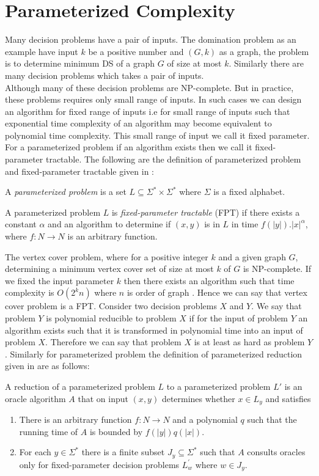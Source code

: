 \section{Parameterized Complexity}
\noindent
Many decision problems have a pair of inputs. The domination problem as an example have input $k$ be a positive number and $(G,k)$ as a graph, the problem is to determine minimum DS of a graph $G$ of size at most $k$. Similarly there are many decision problems which takes a pair of inputs.\\
\noindent
Although many of these decision problems are NP-complete. But in practice, these problems requires only small range of inputs. In such cases we can design an algorithm for fixed range of inputs i.e for small range of inputs such that exponential time complexity of an algorithm may become equivalent to polynomial time complexity. This small range of input we call it fixed parameter. For a parameterized problem if an algorithm exists then we call it fixed-parameter tractable. The following are the definition of parameterized problem and fixed-parameter tractable given in \cite{ppc}:
\begin{Definition}
A \textit{parameterized problem} is a set $L \subseteq \Sigma ^* \times \Sigma ^*$ where $ \Sigma $ is a fixed alphabet.
\end{Definition}
\begin{Definition}
A {parameterized problem} $L$ is \textit{fixed-parameter tractable} (FPT) if there exists a constant $\alpha$ and an algorithm to determine if $(x,y)$ is in $L$ in time $f(|y|).|x|^{ \alpha }$, where $f:N \rightarrow N$ is an arbitrary function.
\end{Definition}
\noindent
The vertex cover problem, where for a positive integer $k$ and a given graph $G$, determining a minimum vertex cover set of size at most $k$ of $G$ is NP-complete. If we fixed the input parameter $k$ then there exists an algorithm such that time complexity is $O(2^kn)$ where $n$ is order of graph \cite{ppc} . Hence we can say that vertex cover problem is a FPT. Consider two decision problems $X$ and $Y$. We say that problem $Y$ is polynomial reducible to problem $X$ if for the input of problem $Y$ an algorithm exists such that it is transformed in polynomial time into an input of problem $X$. Therefore we can say that problem $X$ is at least as hard as problem $Y$. Similarly for parameterized problem the definition of parameterized reduction given in \cite{ppc} are as follows:
\begin{Definition}
A reduction of a parameterized problem $L$ to a parameterized problem $L'$ is an oracle  algorithm $A$ that on input $(x,y)$ determines whether $x \in L_y$ and satisfies
\begin{enumerate}[nolistsep]
\item There is an arbitrary function $f:N \rightarrow N$ and a polynomial $q$ such that the  running time of $A$ is bounded by $f(|y|)q(|x|)$.
\item For each $y \in \Sigma^*$ there is a finite subset $J_y \subseteq \Sigma^*$ such that $A$ consults oracles only for fixed-parameter decision problems $L_{w}^{'}$ where $ w \in J_y$.
\end{enumerate}
\end{Definition}
